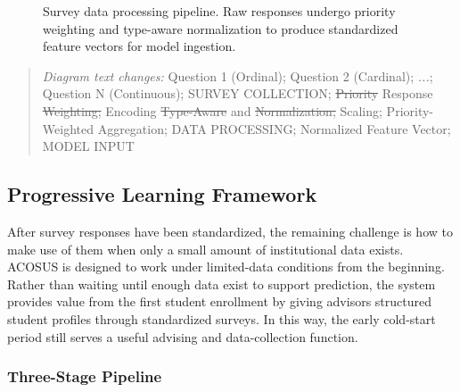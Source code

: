 \documentclass[letterpaper,11pt]{article}
\newcommand{\DIFdel}[1]{%
  \begingroup\setlength{\fboxsep}{0.5pt}%
  \colorbox{diffdelbg}{\textcolor{diffdeltext}{\sout{#1}}}%
  \endgroup}
\newcommand{\DIFadd}[1]{%
  \begingroup\setlength{\fboxsep}{0.5pt}%
  \colorbox{diffaddbg}{\textcolor{diffaddtext}{#1}}%
  \endgroup}
\begin{document}
\begin{figure}[htbp]
{
}\caption{Survey data processing pipeline. Raw responses undergo priority weighting and type-aware normalization to produce standardized feature vectors for model ingestion.}
\label{fig:processing}
\end{figure}

\begin{quote}\footnotesize
\textit{Diagram text changes:} Question 1 (Ordinal); Question 2 (Cardinal); \textit{...}; Question N (Continuous); SURVEY COLLECTION; \DIFdel{Priority} \DIFadd{Response} \DIFdel{Weighting;} \DIFadd{Encoding} \DIFdel{Type-Aware} \DIFadd{and} \DIFdel{Normalization;} \DIFadd{Scaling;} \DIFadd{Priority-Weighted} \DIFadd{Aggregation;} DATA PROCESSING; Normalized Feature Vector; MODEL INPUT
\end{quote}

\subsection{Progressive Learning Framework}\label{subsec:progressive}

After survey responses have been standardized, the remaining challenge is how to make use of them when only a small amount of institutional data exists. ACOSUS is designed to work under limited-data conditions from the beginning. Rather than waiting until enough data exist to support prediction, the system provides value from the first student enrollment by giving advisors structured student profiles through standardized surveys. In this way, the early cold-start period still serves a useful advising and data-collection function.

\subsubsection{Three-Stage Pipeline}
\end{document}
